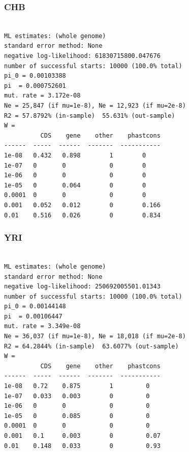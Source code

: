 \documentclass[11pt]{article}
\begin{document}
\subsubsection*{CHB}
\begin{minipage}{\linewidth}\begin{footnotesize}
\begin{verbatim}

ML estimates: (whole genome)
standard error method: None
negative log-likelihood: 61830715800.047676
number of successful starts: 10000 (100.0% total)
pi_0 = 0.00103388
pi  = 0.000752601
mut. rate = 3.172e-08 
Ne = 25,847 (if mu=1e-8), Ne = 12,923 (if mu=2e-8)
R2 = 57.8792% (in-sample)  55.631% (out-sample)
W = 
          CDS    gene    other    phastcons
------  -----  ------  -------  -----------
1e-08   0.432   0.898        1        0
1e-07   0       0            0        0
1e-06   0       0            0        0
1e-05   0       0.064        0        0
0.0001  0       0            0        0
0.001   0.052   0.012        0        0.166
0.01    0.516   0.026        0        0.834
\end{verbatim}
\end{footnotesize}\end{minipage}


\subsubsection*{YRI}
\begin{minipage}{\linewidth}\begin{footnotesize}
\begin{verbatim}

ML estimates: (whole genome)
standard error method: None
negative log-likelihood: 250692005501.01343
number of successful starts: 10000 (100.0% total)
pi_0 = 0.00144148
pi  = 0.00106447
mut. rate = 3.349e-08 
Ne = 36,037 (if mu=1e-8), Ne = 18,018 (if mu=2e-8)
R2 = 64.2844% (in-sample)  63.6077% (out-sample)
W = 
          CDS    gene    other    phastcons
------  -----  ------  -------  -----------
1e-08   0.72    0.875        1         0
1e-07   0.033   0.003        0         0
1e-06   0       0            0         0
1e-05   0       0.085        0         0
0.0001  0       0            0         0
0.001   0.1     0.003        0         0.07
0.01    0.148   0.033        0         0.93
\end{verbatim}
\end{footnotesize}\end{minipage}
\end{document}
